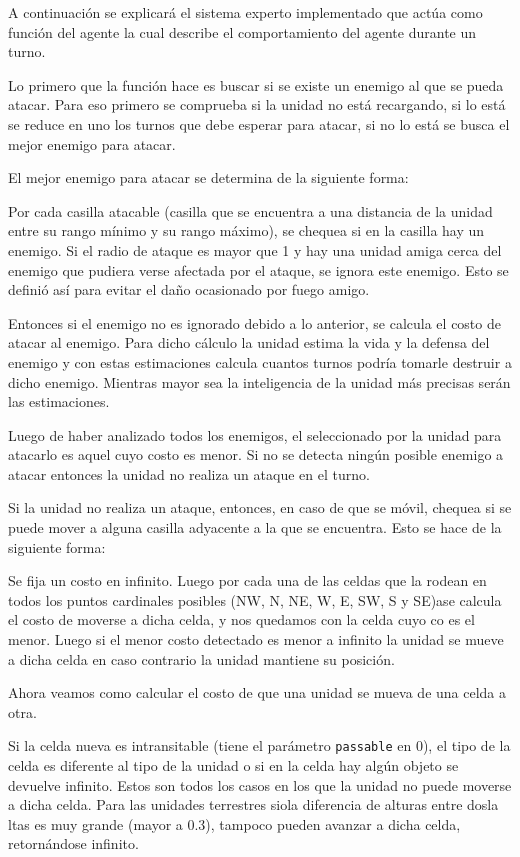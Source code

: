 A continuación se explicará el sistema experto implementado que actúa como función del agente la cual describe el comportamiento del agente durante un turno.


Lo primero que la función hace es buscar si se existe un enemigo al que se pueda atacar. Para eso primero se comprueba si la unidad no está recargando, si lo está se reduce en uno los turnos que debe esperar para atacar, si no lo está se busca el mejor enemigo para atacar. 
 
El mejor enemigo para atacar se determina de la siguiente forma:
 
Por cada casilla atacable (casilla que se encuentra a una distancia de la unidad entre su rango mínimo y su rango máximo), se chequea si en la casilla hay un enemigo. Si el radio de ataque es mayor que 1 y hay una unidad amiga cerca del enemigo que pudiera verse afectada por el ataque, se ignora este enemigo. Esto se definió así para evitar el daño ocasionado por fuego amigo.
 
Entonces si el enemigo no es ignorado debido a lo anterior, se calcula el costo de atacar al enemigo. Para dicho cálculo la unidad estima la vida y la defensa del enemigo y con estas estimaciones calcula cuantos turnos podría tomarle destruir a dicho enemigo. Mientras mayor sea la inteligencia de la unidad más precisas serán las estimaciones.

Luego de haber analizado todos los enemigos, el seleccionado por la unidad para atacarlo es aquel cuyo costo es menor. Si no se detecta ningún posible enemigo a atacar entonces la unidad no realiza un ataque en el turno.
 
Si la unidad no realiza un ataque, entonces, en caso de que se móvil, chequea si se puede mover a alguna casilla adyacente a la que se encuentra. Esto se hace de la siguiente forma:
 
Se fija un costo en infinito. Luego por cada una de las celdas que la rodean en todos los puntos cardinales posibles (NW, N, NE, W, E, SW, S y SE)ase calcula el costo de moverse a dicha celda, y nos quedamos con la celda cuyo co es el menor. Luego si el menor costo detectado es menor a infinito la unidad se mueve a dicha celda en caso contrario la unidad mantiene su posición. 
 
Ahora veamos como calcular el costo de que una unidad se mueva de una celda a otra.
 
Si la celda nueva es intransitable (tiene el parámetro \verb|passable| en 0), el tipo de la celda es diferente al tipo de la unidad o si en la celda hay algún objeto se devuelve infinito. Estos son todos los casos en los que la unidad no puede moverse a dicha celda. Para las unidades terrestres siola diferencia de alturas entre dosla ltas es muy grande (mayor a 0.3), tampoco pueden avanzar a dicha celda, retornándose infinito. 
 

